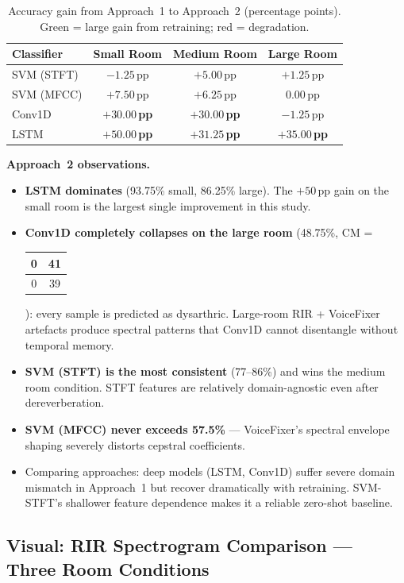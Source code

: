 \documentclass[12pt,a4paper,onecolumn]{exam}
\newcommand{\best}[1]{\cellcolor{bestcol}\textbf{#1}}
\newcommand{\bad}[1]{\cellcolor{warnred}#1}
\newcommand{\CM}[4]{%
  {\scriptsize\begin{tabular}{c|c}#1&#2\\\hline#3&#4\end{tabular}}%
}
\begin{document}
\begin{table}[H]
\centering
\caption{Accuracy gain from Approach~1 to Approach~2 (percentage points).
Green = large gain from retraining; red = degradation.}
\label{tab:35_delta}
\setlength{\tabcolsep}{8pt}
\begin{tabular}{lccc}
\toprule
\textbf{Classifier} & \textbf{Small Room} & \textbf{Medium Room} & \textbf{Large Room} \\
\midrule
SVM (STFT) & $-1.25$\,pp         & $+5.00$\,pp         & $+1.25$\,pp \\
SVM (MFCC) & $+7.50$\,pp         & $+6.25$\,pp         & $0.00$\,pp \\
Conv1D     & \best{$+30.00$\,pp} & \best{$+30.00$\,pp} & \bad{$-1.25$\,pp} \\
LSTM       & \best{$+50.00$\,pp} & \best{$+31.25$\,pp} & \best{$+35.00$\,pp} \\
\bottomrule
\end{tabular}
\end{table}

\noindent\textbf{Approach~2 observations.}
\begin{itemize}\setlength\itemsep{1pt}
  \item \textbf{LSTM dominates} (93.75\% small, 86.25\% large). The $+50$\,pp gain on the small room is the largest single improvement in this study.
  \item \textbf{Conv1D completely collapses on the large room} (48.75\%, CM = \CM{0}{41}{0}{39}): every sample is predicted as dysarthric. Large-room RIR + VoiceFixer artefacts produce spectral patterns that Conv1D cannot disentangle without temporal memory.
  \item \textbf{SVM (STFT) is the most consistent} (77--86\%) and wins the medium room condition. STFT features are relatively domain-agnostic even after dereverberation.
  \item \textbf{SVM (MFCC) never exceeds 57.5\%} --- VoiceFixer's spectral envelope shaping severely distorts cepstral coefficients.
  \item Comparing approaches: deep models (LSTM, Conv1D) suffer severe domain mismatch in Approach~1 but recover dramatically with retraining. SVM-STFT's shallower feature dependence makes it a reliable zero-shot baseline.
\end{itemize}

\subsection*{Visual: RIR Spectrogram Comparison --- Three Room Conditions}
\end{document}
